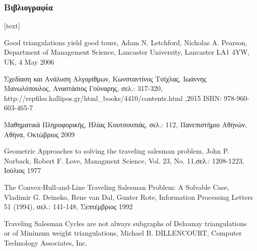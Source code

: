 \documentclass[xcolor=dvipsnames, 11pt]{beamer}
\begin{document}
\begin{frame}
	\frametitle{Βιβλιογραφία}
	\footnotesize
	\begin{thebibliography}{depth}
		
		Good triangulations yield good tours,
		Adam N. Letchford, Nicholas A. Pearson,
		Department of Management Science, Lancaster University, Lancaster LA1 4YW, UK, 
		4 May 2006
		
		Σχεδίαση και Ανάλυση Αλγορίθμων,
		Κωνσταντίνος Τσίχλας, Ιωάννης Μανωλόπουλος, Αναστάσιος Γούναρης,
		σελ.: 317-320,
		http://repfiles.kallipos.gr/html\_books/4410/contents.html ,2015
		ISBN: 978-960-603-465-7
		
		Μαθηματικά Πληροφορικής,
		Ηλίας Κουτσουπιάς,
		σελ.: 112,
		Πανεπιστήμιο Αθηνών, Αθήνα, Οκτώβριος 2009
		
		Geometric Approaches to solving the traveling salesman problem,
		John P. Norback, Robert F. Love,
		Managment Science, Vol. 23, No. 11,σελ.: 1208-1223,
		Ιούλιος 1977
		
		The Convex-Hull-and-Line
		Traveling Salesman Problem: A Solvable Case,
		Vladimir G. Deineko, Rene van Dal, Gunter Rote,
		Information Processing Letters 51 (1994), σελ.: 141-148,
		Σεπτέμβριος 1992
		
		Traveling Salesman Cycles are not always subgraphs of Delaunay triangulations or of Minimum weight triangulations,	Michael B. DILLENCOURT,
		Computer Technology Associates, Inc.
	\end{thebibliography}
\end{frame}
\end{document}
